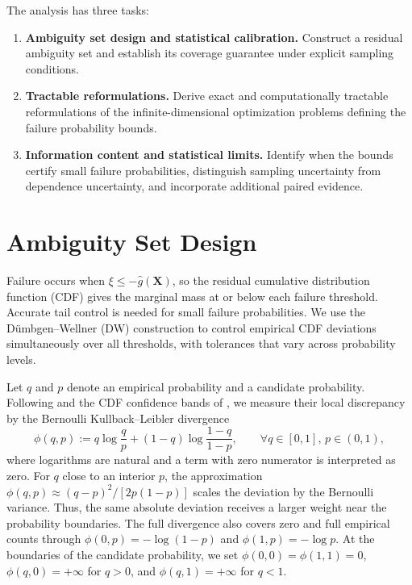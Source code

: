 \documentclass[review,11pt,3p,authoryear,nopreprintline]{elsarticle}
\begin{document}
The analysis has three tasks:
\begin{enumerate}
  \item \textbf{Ambiguity set design and statistical calibration.} Construct a residual ambiguity set and establish its coverage guarantee under explicit sampling conditions.
  \item \textbf{Tractable reformulations.} Derive exact and computationally tractable reformulations of the infinite-dimensional optimization problems defining the failure probability bounds.
  \item \textbf{Information content and statistical limits.} Identify when the bounds certify small failure probabilities, distinguish sampling uncertainty from dependence uncertainty, and incorporate additional paired evidence.
\end{enumerate}


\section{Ambiguity Set Design}
\label{sec-ambiguity-set}

Failure occurs when $\xi\le-\hat g(\bm X)$, so the residual cumulative distribution function (CDF) gives the marginal mass at or below each failure threshold. Accurate tail control is needed for small failure probabilities. We use the D\"umbgen--Wellner (DW) construction \citep{L.J23} to control empirical CDF deviations simultaneously over all thresholds, with tolerances that vary across probability levels.

Let $q$ and $p$ denote an empirical probability and a candidate probability. Following \citet{B.J79} and the CDF confidence bands of \citet{O95}, we measure their local discrepancy by the Bernoulli Kullback--Leibler divergence
\begin{equation}
  \phi(q,p):=q\log\frac{q}{p}+(1-q)\log\frac{1-q}{1-p},\qquad \forall q\in[0,1],\, p\in(0,1),
  \label{eq-bernoulli-kl}
\end{equation}
where logarithms are natural and a term with zero numerator is interpreted as zero. For $q$ close to an interior $p$, the approximation $\phi(q,p)\approx(q-p)^2/[2p(1-p)]$ scales the deviation by the Bernoulli variance. Thus, the same absolute deviation receives a larger weight near the probability boundaries. The full divergence also covers zero and full empirical counts through $\phi(0,p)=-\log(1-p)$ and $\phi(1,p)=-\log p$. At the boundaries of the candidate probability, we set $\phi(0,0)=\phi(1,1)=0$, $\phi(q,0)=+\infty$ for $q>0$, and $\phi(q,1)=+\infty$ for $q<1$.
\end{document}
